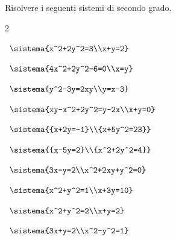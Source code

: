 \begin{esercizio}[*]
\label{ese:6.1}
Risolvere i seguenti sistemi di secondo grado.
\begin{htmulticols}{2}
\begin{enumeratea}
\item~\(\sistema{x^2+2y^2=3\\x+y=2}\)
\item~\(\sistema{4x^2+2y^2-6=0\\x=y}\)
\item~\(\sistema{y^2-3y=2xy\\y=x-3}\)
\item~\(\sistema{xy-x^2+2y^2=y-2x\\x+y=0}\)
\item~\(\sistema{{x+2y=-1}\\{x+5y^2=23}}\)
\item~\(\sistema{{x-5y=2}\\{x^2+2y^2=4}}\)
\item~\(\sistema{3x-y=2\\x^2+2xy+y^2=0}\)
\item~\(\sistema{x^2+y^2=1\\x+3y=10}\)
\sol{\emptyset}
\item~\(\sistema{x^2+y^2=2\\x+y=2}\)
\item~\(\sistema{3x+y=2\\x^2-y^2=1}\)
\sol{\emptyset}
\end{enumeratea}
\end{htmulticols}
\end{esercizio}

